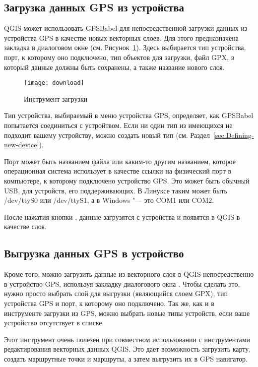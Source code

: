 \subsection{Загрузка данных GPS из устройства}

QGIS может использовать GPSBabel для непосредственной загрузки данных из
устройства GPS в качестве новых векторных слоев. Для этого предназначена
закладка  в диалоговом окне 
(см. Рисунок~\ref{figure_download}). Здесь выбирается тип устройства,
порт, к которому оно подключено, тип объектов для загрузки, файл GPX, в
который данные должны быть сохранены, а также название нового слоя.

\begin{figure}[ht]
   \centering
   \texttt{[image: download]}
   \caption{Инструмент загрузки \nixcaption}\label{figure_download}
\end{figure}

Тип устройства, выбираемый в меню устройства GPS, определяет, как
GPSBabel попытается соединиться с устройтвом. Если ни один тип из
имеющихся не подходит вашему устройству, можно создать новый тип
(см. Раздел~\ref{sec:Defining-new-device}).

Порт может быть названием файла или каким-то другим названием, которое
операционная система использует в качестве ссылки на физический порт в
компьютере, к которому подключено устройство GPS. Это может быть
обычный USB, для устройств, его поддерживающих.
\nix В Линуксе таким может быть /dev/ttyS0 или /dev/ttyS1, а в
\win Windows "--- это COM1 или COM2.

После нажатия кнопки , данные загрузятся с устройства и
появятся в QGIS в качестве слоя.

\subsection{Выгрузка данных GPS в устройство}

Кроме того, можно загрузить данные из векторного слоя в QGIS
непосредственно в устройство GPS, используя закладку 
диалогового окна . Чтобы сделать это, нужно просто
выбрать слой для выгрузки (являющийся слоем GPX), тип устройства GPS и
порт, к которому оно подключено. Так же, как и в инструменте загрузки
из GPS, можно выбрать новые типы устройств, если ваше устройство
отсутствует в списке.

Этот инструмент очень полезен при совместном использовании с
инструментами редактирования векторных данных QGIS. Это дает возможность
загрузить карту, создать маршрутные точки и маршруты, а затем выгрузить
их в GPS навигатор.

